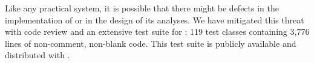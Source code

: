 Like any practical system, it is possible that there might
be defects in the implementation of \tool or in the design of
its analyses. We have mitigated this threat with code review and an extensive
test suite for \tool:
119 test classes containing 3,776 lines of non-comment, non-blank code.
This test suite is publicly available and distributed with \tool.

